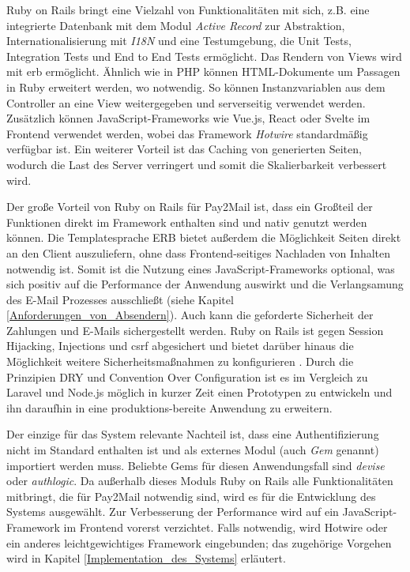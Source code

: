 Ruby on Rails bringt eine Vielzahl von Funktionalitäten mit sich, z.B. eine integrierte Datenbank mit dem Modul \textit{Active Record} zur Abstraktion, Internationalisierung mit \textit{I18N} und eine Testumgebung, die Unit Tests, Integration Tests und End to End Tests ermöglicht. Das Rendern von Views wird mit \acrfull{erb} ermöglicht. Ähnlich wie in PHP können HTML-Dokumente um Passagen in Ruby erweitert werden, wo notwendig. So können Instanzvariablen aus dem Controller an eine View weitergegeben und serverseitig verwendet werden. Zusätzlich können JavaScript-Frameworks wie Vue.js, React oder Svelte im Frontend verwendet werden, wobei das Framework \textit{Hotwire} standardmäßig verfügbar ist. Ein weiterer Vorteil ist das Caching von generierten Seiten, wodurch die Last des Server verringert und somit die Skalierbarkeit verbessert wird.

Der große Vorteil von Ruby on Rails für Pay2Mail ist, dass ein Großteil der Funktionen direkt im Framework enthalten sind und nativ genutzt werden können. Die Templatesprache ERB bietet außerdem die Möglichkeit Seiten direkt an den Client auszuliefern, ohne dass Frontend-seitiges Nachladen von Inhalten notwendig ist. Somit ist die Nutzung eines JavaScript-Frameworks optional, was sich positiv auf die Performance der Anwendung auswirkt und die Verlangsamung des E-Mail Prozesses ausschließt (siehe Kapitel \ref{Anforderungen_von_Absendern}). Auch kann die geforderte Sicherheit der Zahlungen und E-Mails sichergestellt werden. Ruby on Rails ist gegen Session Hijacking, Injections und \acrfull{csrf} abgesichert und bietet darüber hinaus die Möglichkeit weitere Sicherheitsmaßnahmen zu konfigurieren \citep{Hansson2022}. Durch die Prinzipien DRY und Convention Over Configuration ist es im Vergleich zu Laravel und Node.js möglich in kurzer Zeit einen Prototypen zu entwickeln und ihn daraufhin in eine produktions-bereite Anwendung zu erweitern.

Der einzige für das System relevante Nachteil ist, dass eine Authentifizierung nicht im Standard enthalten ist und als externes Modul (auch \textit{Gem} genannt) importiert werden muss. Beliebte Gems für diesen Anwendungsfall sind \textit{devise} oder \textit{authlogic}. Da außerhalb dieses Moduls Ruby on Rails alle Funktionalitäten mitbringt, die für Pay2Mail notwendig sind, wird es für die Entwicklung des Systems ausgewählt. Zur Verbesserung der Performance wird auf ein JavaScript-Framework im Frontend vorerst verzichtet. Falls notwendig, wird Hotwire oder ein anderes leichtgewichtiges Framework eingebunden; das zugehörige Vorgehen wird in Kapitel \ref{Implementation_des_Systems} erläutert.
